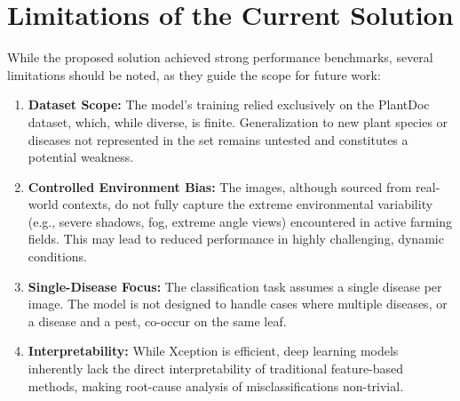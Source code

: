 \documentclass[12pt, a4paper]{report}
\begin{document}
\section{Limitations of the Current Solution}
\label{sec:limitations}
\noindent
While the proposed solution achieved strong performance benchmarks, several limitations should be noted, as they guide the scope for future work:
\begin{enumerate}
    \item \textbf{Dataset Scope:} The model's training relied exclusively on the PlantDoc dataset, which, while diverse, is finite. Generalization to new plant species or diseases not represented in the set remains untested and constitutes a potential weakness.
    \item \textbf{Controlled Environment Bias:} The images, although sourced from real-world contexts, do not fully capture the extreme environmental variability (e.g., severe shadows, fog, extreme angle views) encountered in active farming fields. This may lead to reduced performance in highly challenging, dynamic conditions.
    \item \textbf{Single-Disease Focus:} The classification task assumes a single disease per image. The model is not designed to handle cases where multiple diseases, or a disease and a pest, co-occur on the same leaf.
    \item \textbf{Interpretability:} While Xception is efficient, deep learning models inherently lack the direct interpretability of traditional feature-based methods, making root-cause analysis of misclassifications non-trivial.
\end{enumerate}
\end{document}
